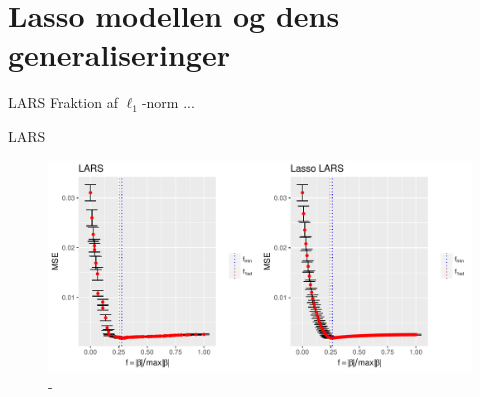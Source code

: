 \section{Lasso modellen og dens generaliseringer}
\begin{frame}{LARS}
Fraktion af \(\ell_1\)-norm ...
\end{frame}

\begin{frame}{LARS}
\begin{figure}
 \includegraphics[width=1\linewidth, height=0.7\textheight]{slides/lars_kryds.pdf}
 \caption{-}
 \end{figure}
\end{frame}

